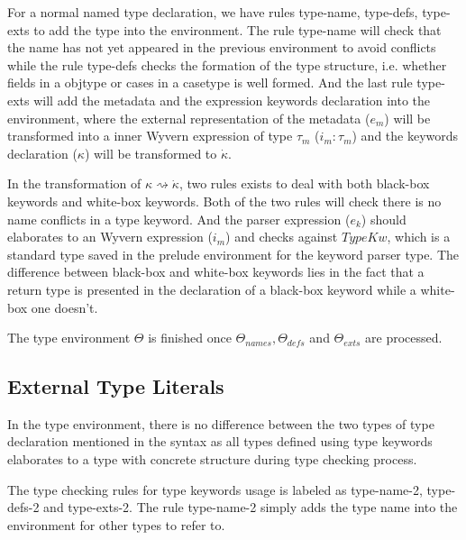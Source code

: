 \documentclass{sig-alternate}
\begin{document}
For a normal named type declaration, we have rules type-name, type-defs, type-exts to add the type into the environment. The rule type-name will check that the name has not yet appeared in the previous environment to avoid conflicts while the rule type-defs checks the formation of the type structure, i.e. whether fields in a objtype or cases in a casetype is well formed. And the last rule type-exts will add the metadata and the expression keywords declaration into the environment, where the external representation of the metadata ($e_m$) will be transformed into a inner Wyvern expression of type $\tau_m$ ($i_m:\tau_m$) and the keywords declaration ($\kappa$) will be transformed to $\dot\kappa$. 

In the transformation of $\kappa\rightsquigarrow\dot\kappa$, two rules exists to deal with both black-box keywords and white-box keywords. Both of the two rules will check there is no name conflicts in a type keyword. And the parser expression ($e_k$) should elaborates to an Wyvern expression ($i_m$) and checks against $TypeKw$, which is a standard type saved in the prelude environment for the keyword parser type. The difference between black-box and white-box keywords lies in the fact that a return type is presented in the declaration of a black-box keyword while a white-box one doesn't.

The type environment $\Theta$ is finished once $\Theta_{names}, \Theta_{defs}$ and $\Theta_{exts}$ are processed.
\subsection{External Type Literals}
In the type environment, there is no difference between the two types of type declaration mentioned in the syntax as all types defined using type keywords elaborates to a type with concrete structure during type checking process.

The type checking rules for type keywords usage is labeled as type-name-2, type-defs-2 and type-exts-2. The rule type-name-2 simply adds the type name into the environment for other types to refer to.
\end{document}
